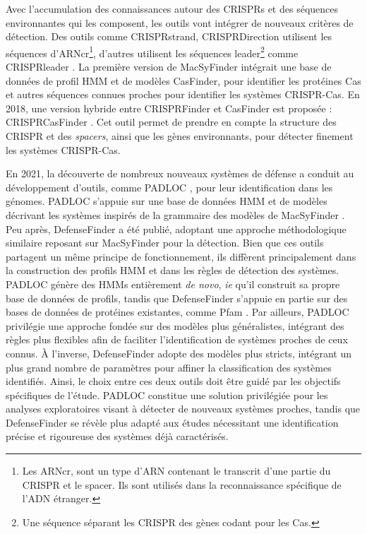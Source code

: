 Avec l'accumulation des connaissances autour des CRISPRs et des séquences environnantes qui les composent, les outils vont intégrer de nouveaux critères de détection. Des outils comme CRISPRstrand\cite{alkhnbashi_crisprstrand_2014}, CRISPRDirection\cite{biswas_accurate_2014} utilisent les séquences d'ARNcr\footnote{Les ARNcr, sont un type d'ARN contenant le transcrit d'une partie du CRISPR et le spacer. Ils sont utilisés dans la reconnaissance spécifique de l'ADN étranger.}, d'autres utilisent les séquences leader\footnote{Une séquence séparant les CRISPR des gènes codant pour les Cas.} comme CRISPRleader \cite{alkhnbashi_characterizing_2016}. La première version de MacSyFinder \cite{abby_macsyfinder_2014} intégrait une base de données de profil HMM et de modèles CasFinder, pour identifier les protéines Cas et autres séquences connues proches pour identifier les systèmes CRISPR-Cas. En 2018, une version hybride entre CRISPRFinder et CasFinder est proposée : CRISPRCasFinder \cite{couvin_crisprcasfinder_2018}. Cet outil permet de prendre en compte la structure des CRISPR et des \textit{spacers}, ainsi que les gènes environnants, pour détecter finement les systèmes CRISPR-Cas.


En 2021, la découverte de nombreux nouveaux systèmes de défense a conduit au développement d’outils, comme PADLOC \cite{payne_identification_2021}, pour leur identification dans les génomes. PADLOC s’appuie sur une base de données HMM et de modèles décrivant les systèmes inspirés de la grammaire des modèles de MacSyFinder \cite{abby_macsyfinder_2014}. Peu après, DefenseFinder \cite{tesson_systematic_2022} a été publié, adoptant une approche méthodologique similaire reposant sur MacSyFinder pour la détection.
Bien que ces outils partagent un même principe de fonctionnement, ils diffèrent principalement dans la construction des profils HMM et dans les règles de détection des systèmes. PADLOC génère des HMMs entièrement \textit{de novo}, \textit{ie} qu'il construit sa propre base de données de profils, tandis que DefenseFinder s’appuie en partie sur des bases de données de protéines existantes, comme Pfam \cite{mistry_pfam_2021}. Par ailleurs, PADLOC privilégie une approche fondée sur des modèles plus généralistes, intégrant des règles plus flexibles afin de faciliter l’identification de systèmes proches de ceux connus. À l’inverse, DefenseFinder adopte des modèles plus stricts, intégrant un plus grand nombre de paramètres pour affiner la classification des systèmes identifiés.
Ainsi, le choix entre ces deux outils doit être guidé par les objectifs spécifiques de l’étude. PADLOC constitue une solution privilégiée pour les analyses exploratoires visant à détecter de nouveaux systèmes proches, tandis que DefenseFinder se révèle plus adapté aux études nécessitant une identification précise et rigoureuse des systèmes déjà caractérisés.